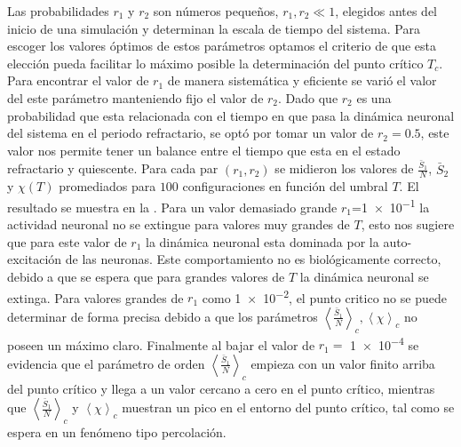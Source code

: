 Las probabilidades $r_1$ y $r_2$  son números pequeños, $r_1,r_2\ll1$, elegidos antes del inicio de una simulación y determinan la escala de tiempo del sistema. Para escoger  los valores óptimos de estos parámetros  optamos el  criterio  de que esta elección pueda facilitar lo máximo posible la determinación del punto crítico $T_c$.     Para encontrar el valor de $r_1$  de manera   sistemática  y eficiente   se varió  el valor del  este parámetro  manteniendo fijo el  valor  de $r_2$. Dado que $r_2$ es una probabilidad que esta relacionada con el tiempo en que pasa la dinámica neuronal del sistema en el periodo refractario, se optó por tomar un valor de $r_2=0.5$, este valor nos permite  tener un balance entre el tiempo que esta en el estado  refractario y quiescente.  Para cada par $(r_1,r_2)$  se midieron los valores de $\frac{\bar{S}_1}{N}$, $\bar{S}_2$ y $\chi(T)$ promediados para $100$ configuraciones en función del umbral $T$.   El resultado se muestra en la . Para un valor demasiado grande     $r_1$=\num{1e-1}  la actividad neuronal  no se extingue para valores muy grandes de  $T$, esto nos sugiere que para este valor de $r_1$  la dinámica neuronal esta dominada por  la  auto-excitación  de las neuronas. Este comportamiento no es biológicamente correcto, debido a  que se espera que para grandes valores de $T$ la dinámica neuronal se extinga.  Para valores grandes de $r_1$ como  \num{1e-2}, el punto critico no se puede determinar de forma precisa debido a que los parámetros   $\left\langle\frac{\bar{S}_1}{N}\right\rangle_c, \left\langle\chi\right\rangle_c$   no poseen un máximo claro. Finalmente al bajar el valor de $r_1=$ \num{1e-4} se evidencia  que el parámetro de orden $\left\langle\frac{\bar{S}_1}{N}\right\rangle_c$ empieza con un valor finito arriba del punto crítico y llega  a un  valor cercano a cero en el punto crítico, mientras que $\left\langle\frac{\bar{S}_1}{N}\right\rangle_c$ y $\left\langle\chi\right\rangle_c$ muestran un pico en el entorno del punto crítico, tal como se espera en un fenómeno tipo percolación.\\


